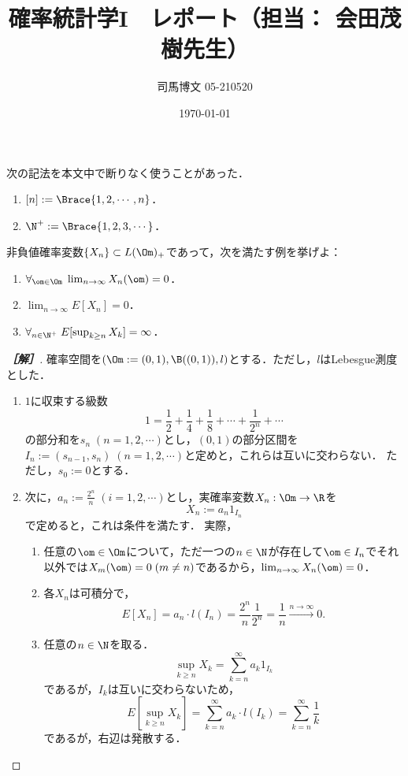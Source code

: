 \documentclass[uplatex,dvipdfmx]{jsarticle}
\title{確率統計学I　レポート（担当： 会田茂樹先生）}
\author{司馬博文 05-210520}
\date{\today}
\begin{document}
\maketitle

\begin{notation*}
    次の記法を本文中で断りなく使うことがあった．
    \begin{enumerate}
        \item $[n]:=\Brace{1,2,\cdots,n}$．
        \item $\N^+:=\Brace{1,2,3,\cdots}$．
    \end{enumerate}
\end{notation*}

\begin{problem*}[2]
    非負値確率変数$\{X_n\}\subset L(\Om)_+$であって，次を満たす例を挙げよ：
    \begin{enumerate}
        \item $\forall_{\om\in\Om}\;\lim_{n\to\infty}X_n(\om)=0$．
        \item $\lim_{n\to\infty}E[X_n]=0$．
        \item $\forall_{n\in\N^+}\;E[\sup_{k\ge n}X_k]=\infty$．
    \end{enumerate}
\end{problem*}
\begin{proof}[\bf［解］]
    確率空間を$(\Om:=(0,1),\B((0,1)),l)$とする．ただし，$l$はLebesgue測度とした．
    \begin{enumerate}[{第}1{段}]
        \item $1$に収束する級数
        \[1=\frac{1}{2}+\frac{1}{4}+\frac{1}{8}+\cdots+\frac{1}{2^n}+\cdots\]
        の部分和を$s_n\;(n=1,2,\cdots)$とし，$(0,1)$の部分区間を
        $I_n:=(s_{n-1},s_{n})\;(n=1,2,\cdots)$と定めと，これらは互いに交わらない．
        ただし，$s_0:=0$とする．
        \item 次に，$a_n:=\frac{2^n}{n}\;(i=1,2,\cdots)$とし，実確率変数$X_n:\Om\to\R$を
        \[X_n:=a_n1_{I_n}\]
        で定めると，これは条件を満たす．
        実際，
        \begin{enumerate}[(1)]
            \item 任意の$\om\in\Om$について，ただ一つの$n\in\N$が存在して$\om\in I_n$でそれ以外では$X_m(\om)=0\;(m\ne n)$であるから，$\lim_{n\to\infty}X_n(\om)=0$．
            \item 各$X_n$は可積分で，
            \[E[X_n]=a_n\cdot l(I_n)=\frac{2^n}{n}\frac{1}{2^n}=\frac{1}{n}\xrightarrow{n\to\infty}0.\]
            \item 任意の$n\in\N$を取る．
            \[\sup_{k\ge n}X_k=\sum_{k=n}^\infty a_k1_{I_k}\]
            であるが，$I_k$は互いに交わらないため，
            \[E[\sup_{k\ge n}X_k]=\sum_{k=n}^\infty a_k\cdot l(I_k)=\sum_{k=n}^\infty\frac{1}{k}\]
            であるが，右辺は発散する．
        \end{enumerate}
    \end{enumerate}
\end{proof}
\end{document}
